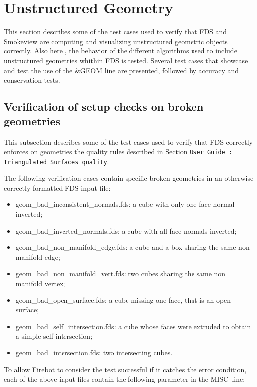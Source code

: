 \documentclass[11pt]{book}
\begin{document}
\chapter{Unstructured Geometry}

This section describes some of the test cases used to verify that FDS and Smokeview are computing
and visualizing unstructured geometric objects correctly. Also here , the behavior of the different
algorithms used to include unstructured geometries whithin FDS is tested. Several test cases that showcase
and test the use of the \&GEOM line are presented, followed by accuracy and conservation tests.


\section{Verification of setup checks on broken geometries}

This subsection describes some of the test cases used to verify that FDS correctly enforces on geometries
the quality rules described in Section \texttt{User Guide : Triangulated Surfaces quality}.

The following verification cases contain specific broken geometries in an otherwise correctly
formatted FDS input file:

\begin{itemize}
  \item {\ct geom\_bad\_inconsistent\_normals.fds}: a cube with only one face normal inverted;
  \item {\ct geom\_bad\_inverted\_normals.fds}: a cube with all face normals inverted;
  \item {\ct geom\_bad\_non\_manifold\_edge.fds}: a cube and a box sharing the same non manifold edge;
  \item {\ct geom\_bad\_non\_manifold\_vert.fds}: two cubes sharing the same non manifold vertex; %
  \item {\ct geom\_bad\_open\_surface.fds}: a cube missing one face, that is an open surface;
  \item {\ct geom\_bad\_self\_intersection.fds}: a cube whose faces were extruded to obtain a simple self-intersection;
  \item {\ct geom\_bad\_intersection.fds}: two intersecting cubes. %
\end{itemize}

To allow Firebot to consider the test successful if it catches the error condition,
each of the above input files contain the following parameter in the {\ct MISC}\ line:
\end{document}

